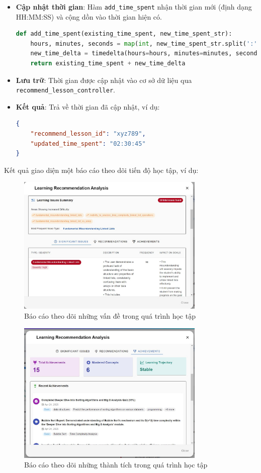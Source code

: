 \begin{itemize}
    \item \textbf{Cập nhật thời gian}: Hàm \texttt{add\_time\_spent} nhận thời gian mới (định dạng HH:MM:SS) và cộng dồn vào thời gian hiện có.
    \begin{lstlisting}[language=Python]
def add_time_spent(existing_time_spent, new_time_spent_str):
    hours, minutes, seconds = map(int, new_time_spent_str.split(':'))
    new_time_delta = timedelta(hours=hours, minutes=minutes, seconds=seconds)
    return existing_time_spent + new_time_delta
    \end{lstlisting}
    \item \textbf{Lưu trữ}: Thời gian được cập nhật vào cơ sở dữ liệu qua \texttt{recommend\_lesson\_controller}.
    \item \textbf{Kết quả}: Trả về thời gian đã cập nhật, ví dụ:
    \begin{lstlisting}[language=JSON]
{
    "recommend_lesson_id": "xyz789",
    "updated_time_spent": "02:30:45"
}
\end{lstlisting}
\end{itemize}

Kết quả giao diện một báo cáo theo dõi tiến độ học tập, ví dụ:
\begin{figure}[H]
    \centering
    \includegraphics[width=0.8\textwidth]{Images/UI_LLM/tracking_issues.png}
    \caption{Báo cáo theo dõi những vấn đề trong quá trình học tập}
\end{figure}

\begin{figure}[H]
    \centering
    \includegraphics[width=0.8\textwidth]{Images/UI_LLM/tracking_achivement.png}
    \caption{Báo cáo theo dõi những thành tích trong quá trình học tập}
\end{figure}
